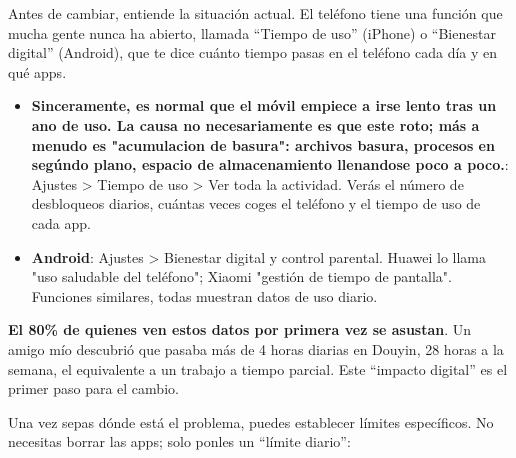 


Antes de cambiar, entiende la situación actual. El teléfono tiene una función que mucha gente nunca ha abierto, llamada “Tiempo de uso” (iPhone) o “Bienestar digital” (Android), que te dice cuánto tiempo pasas en el teléfono cada día y en qué apps.

\begin{itemize}
  \item \textbf{Sinceramente, es normal que el móvil empiece a irse lento tras un ano de uso. La causa no necesariamente es que este roto; más a menudo es "acumulacion de basura": archivos basura, procesos en segúndo plano, espacio de almacenamiento llenandose poco a poco.}: Ajustes > Tiempo de uso > Ver toda la actividad. Verás el número de desbloqueos diarios, cuántas veces coges el teléfono y el tiempo de uso de cada app.
  \item \textbf{Android}: Ajustes > Bienestar digital y control parental. Huawei lo llama "uso saludable del teléfono"; Xiaomi "gestión de tiempo de pantalla". Funciones similares, todas muestran datos de uso diario.
\end{itemize}

\textbf{El 80\% de quienes ven estos datos por primera vez se asustan}. Un amigo mío descubrió que pasaba más de 4 horas diarias en Douyin, 28 horas a la semana, el equivalente a un trabajo a tiempo parcial. Este “impacto digital” es el primer paso para el cambio.


Una vez sepas dónde está el problema, puedes establecer límites específicos. No necesitas borrar las apps; solo ponles un “límite diario”:

